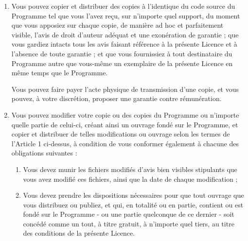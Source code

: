 {\begin{enumerate}
Chaque concessionaire sera désigné par "vous".

Les activités autres que la copie, la distribution et la modification ne sont pas couvertes par la présente Licence ; elles sont hors de son champ d'application.

L'opération consistant à exécuter le Programme n'est soumise à aucune limitation et les sorties du programme ne sont couvertes que si leur contenu constitue un ouvrage fondé sur le Programme (indépendamment du fait qu'il ait été réalisé par l'exécution du Programme).

La validité de ce qui précède dépend de ce que fait le Programme.

\item  Vous pouvez copier et distribuer des copies à l'identique du code source du Programme tel que vous l'avez reçu, sur n'importe quel support, du moment que vous apposiez sur chaque copie, de manière ad hoc et parfaitement visible, l'avis de droit d'auteur adéquat et une exonération de garantie ; que vous gardiez intacts tous les avis faisant référence à la présente Licence et à l'absence de toute garantie ; et que vous fournissiez à tout destinataire du Programme autre que vous-même un exemplaire de la présente Licence en même temps que le Programme.

Vous pouvez faire payer l'acte physique de transmission d'une copie, et vous pouvez, à votre discrétion, proposer une garantie contre rémunération.

\item  Vous pouvez modifier votre copie ou des copies du Programme ou n'importe quelle partie de celui-ci, créant ainsi un ouvrage fondé sur le Programme, et copier et distribuer de telles modifications ou ouvrage selon les termes de l'Article 1 ci-dessus, à condition de vous conformer également à chacune des obligations suivantes :


\begin{enumerate}
\item Vous devez munir les fichiers modifiés d'avis bien visibles stipulants que vous avez modifié ces fichiers, ainsi que la date de chaque modification ;

\item Vous devez prendre les dispositions nécessaires pour que tout ouvrage que vous distribuez ou publiez, et qui, en totalité ou en partie, contient ou est fondé sur le Programme - ou une partie quelconque de ce dernier - soit concédé comme un tout, à titre gratuit, à n'importe quel tiers, au titre des conditions de la présente Licence.


\end{enumerate}
\end{enumerate}}

